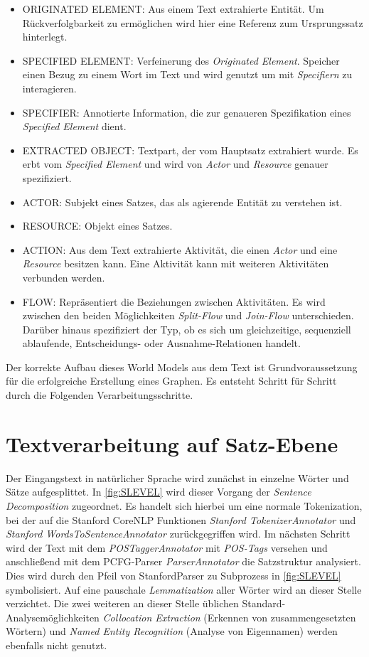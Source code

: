 \begin{itemize} 
\item ORIGINATED ELEMENT: Aus einem Text extrahierte Entität. Um Rückverfolgbarkeit zu ermöglichen wird hier eine Referenz zum Ursprungssatz hinterlegt.
\item SPECIFIED ELEMENT: Verfeinerung des \textit{Originated Element}. Speicher einen Bezug zu einem Wort im Text und wird genutzt um mit \textit{Specifiern} zu interagieren.
\item SPECIFIER: Annotierte Information, die zur genaueren Spezifikation eines \textit{Specified Element} dient.
\item EXTRACTED OBJECT: Textpart, der vom Hauptsatz extrahiert wurde. Es erbt vom \textit{Specified Element} und wird  von \textit{Actor} und \textit{Resource} genauer spezifiziert.
\item ACTOR: Subjekt eines Satzes, das als agierende Entität zu verstehen ist. 
\item RESOURCE: Objekt eines Satzes.
\item ACTION: Aus dem Text extrahierte Aktivität, die einen \textit{Actor} und eine \textit{Resource} besitzen kann. Eine Aktivität kann mit weiteren Aktivitäten verbunden werden.
\item FLOW: Repräsentiert die Beziehungen zwischen Aktivitäten. Es wird zwischen den beiden Möglichkeiten \textit{Split-Flow} und \textit{Join-Flow} unterschieden. Darüber hinaus spezifiziert der Typ, ob es sich um gleichzeitige, sequenziell ablaufende, Entscheidungs- oder Ausnahme-Relationen handelt.
\end{itemize}

Der korrekte Aufbau dieses World Models aus dem Text ist Grundvoraussetzung für die erfolgreiche Erstellung eines Graphen. Es entsteht Schritt für Schritt durch die Folgenden Verarbeitungsschritte.

\section{Textverarbeitung auf Satz-Ebene}

Der Eingangstext in natürlicher Sprache wird zunächst in einzelne Wörter und Sätze aufgesplittet. In \ref{fig:SLEVEL} wird dieser Vorgang der \textit{Sentence Decomposition} zugeordnet. Es handelt sich hierbei um eine normale Tokenization, bei der auf die Stanford CoreNLP Funktionen \textit{Stanford TokenizerAnnotator} und \textit{Stanford WordsToSentenceAnnotator} zurückgegriffen wird. Im nächsten Schritt wird der Text mit dem \textit{POSTaggerAnnotator} mit \textit{POS-Tags} versehen und anschließend mit dem PCFG-Parser \textit{ParserAnnotator} die Satzstruktur analysiert. Dies wird durch den Pfeil von StanfordParser zu Subprozess in \ref{fig:SLEVEL} symbolisiert. Auf eine pauschale \textit{Lemmatization} aller Wörter wird an dieser Stelle verzichtet. Die zwei weiteren an dieser Stelle üblichen Standard-Analysemöglichkeiten \textit{Collocation Extraction} (Erkennen von zusammengesetzten Wörtern) und \textit{Named Entity Recognition} (Analyse von Eigennamen) werden ebenfalls nicht genutzt.\par

